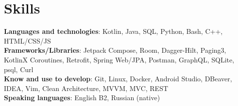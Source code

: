 \documentclass[a4paper,11pt]{article}
\begin{document}
\section{Skills}
 \begin{itemize}[leftmargin=0.15in, label={}]
    \small{\item{
     \textbf{Languages and technologies}{: Kotlin, Java, SQL, Python, Bash, C++, HTML/CSS/JS } \\
     \textbf{Frameworks/Libraries}{: Jetpack Compose, Room, Dagger-Hilt, Paging3, KotlinX Coroutines, Retrofit, Spring Web/JPA, Postman, GraphQL, SQLite, psql, Curl} \\
     \textbf{Know and use to develop}{: Git, Linux, Docker, Android Studio, DBeaver, IDEA, Vim, Clean Architecture, MVVM, MVC, REST} \\
     \textbf{Speaking languages}{: English B2, Russian (native) } \\
     }
     }
 \end{itemize}


%
\end{document}
